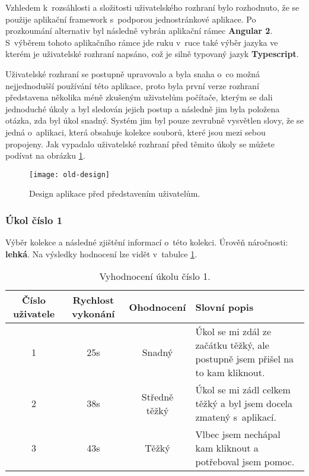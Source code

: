 \par Vzhledem k~rozsáhlosti a složitosti uživatelského rozhraní bylo rozhodnuto, že se použije aplikační framework s~podporou jednostránkové aplikace. Po prozkoumání alternativ byl následně vybrán aplikační rámec \textbf{Angular 2}. S~výběrem tohoto aplikačního rámce jde ruku v~ruce také výběr jazyka ve kterém je uživatelské rozhraní napsáno, což je silně typovaný jazyk \textbf{Typescript}.

\par Uživatelské rozhraní se postupně upravovalo a byla snaha o~co možná nejjednodušší používání této aplikace, proto byla první verze rozhraní představena několika méně zkušeným uživatelům počítače, kterým se dali jednoduché úkoly a byl sledován jejich postup a následně jim byla položena otázka, zda byl úkol snadný. Systém jim byl pouze zevrubně vysvětlen slovy, že se jedná o~aplikaci, která obsahuje kolekce souborů, které jsou mezi sebou propojeny. Jak vypadalo uživatelské rozhraní před těmito úkoly se můžete podívat na obrázku \ref{old-ui}.

\begin{figure}[!h]
\centering
\texttt{[image: old-design]}
\caption{Design aplikace před představením uživatelům.}
\label{old-ui}
\end{figure}

\subsubsection{Úkol číslo 1} Výběr kolekce a následné zjištění informací o~této kolekci. Úrověň náročnosti: \textbf{lehká}. Na výsledky hodnocení lze vidět v~tabulce \ref{ukol-1}.
\begin{table}[htp]
\begin{center}
\begin{tabular}{ || c || c | c | m{5cm} || }
\hline
Číslo uživatele & Rychlost vykonání & Ohodnocení & Slovní popis \\ [0.5ex]
\hline
\hline
1 & 25s & Snadný & Úkol se mi zdál ze začátku těžký, ale postupně jsem přišel na to kam kliknout. \\
\hline
2 & 38s & Středně těžký & Úkol se mi zádl celkem těžký a byl jsem docela zmatený s~aplikací. \\
\hline
3 & 43s & Těžký & Vlbec jsem nechápal kam kliknout a potřeboval jsem pomoc. \\
\hline
\end{tabular}
\end{center}
\caption{Vyhodnocení úkolu číslo 1.}
\label{ukol-1}
\end{table}
